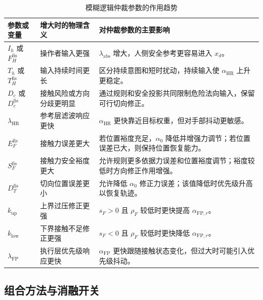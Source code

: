\begin{table}[htbp]
  \centering
  \caption{模糊逻辑仲裁参数的作用趋势}
  \label{tab:ch5_fuzzy_parameter_effects}
  \small
  \begin{tabular}{@{}p{}p{}p{}@{}}
    \toprule
    参数或变量 & 增大时的物理含义 & 对仲裁参数的主要影响 \\
    \midrule
    $I_h$ 或 $F_H^{\mathrm{fis}}$ & 操作者输入更强 & $\lambda_{\mathrm{abs}}$ 增大，人侧安全参考更容易进入 $x_d$。 \\
    $T_h$ 或 $T_H^{\mathrm{fis}}$ & 输入持续时间更长 & 区分持续意图和短时扰动，持续输入使 $\alpha_{\mathrm{HR}}$ 上升更稳定。 \\
    $D_c$ 或 $D_c^{\mathrm{fis}}$ & 接触风险或方向分歧更明显 & 通过规则和安全投影共同限制危险法向输入，保留可行切向修正。 \\
    $\lambda_{\mathrm{HR}}$ & 参考层滤波响应更快 & $\alpha_{\mathrm{HR}}$ 更快靠近目标权重，但对手部抖动更敏感。 \\
    $E_F^{\mathrm{fis}}$ & 接触力误差更大 & 若位置裕度充足，$\alpha_0$ 降低并增强力调节；若位置误差已大，则保持位置恢复能力。 \\
    $S_F^{\mathrm{fis}}$ & 接触力安全裕度更大 & 允许规则更多依据力误差和位置裕度调节；裕度较低时方向修正作用增强。 \\
    $D_T^{\mathrm{fis}}$ & 切向位置误差更小 & 允许降低 $\alpha_0$ 修正力误差；该值降低时优先级升高以恢复轨迹。 \\
    $k_{\mathrm{up}}$ & 上界过压修正更强 & $s_F>0$ 且 $\rho_F$ 较低时更快提高 $\alpha_{\mathrm{FP},r}$。 \\
    $k_{\mathrm{low}}$ & 下界接触不足修正更强 & $s_F<0$ 且 $\rho_F$ 较低时更快降低 $\alpha_{\mathrm{FP},r}$。 \\
    $\lambda_{\mathrm{FP}}$ & 执行层优先级响应更快 & $\alpha_{\mathrm{FP}}$ 更快跟随接触状态变化，但过大时可能引入优先级抖动。 \\
    \bottomrule
  \end{tabular}
\end{table}

\subsection{组合方法与消融开关}
\label{subsec:ch5_method_switch_model}

